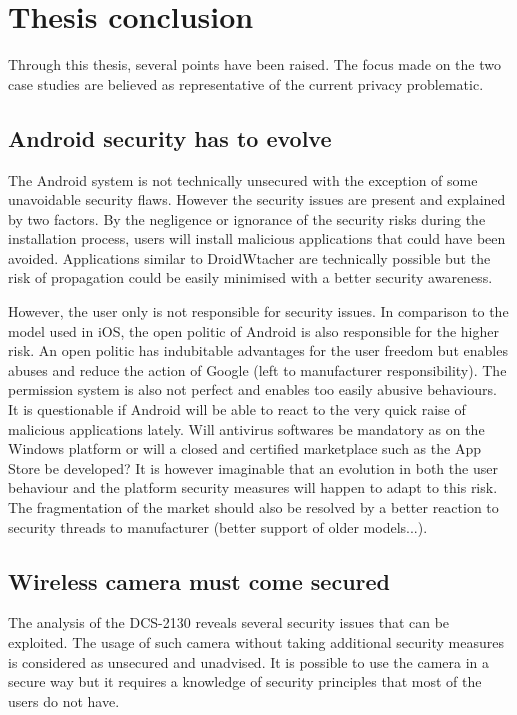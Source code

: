 \chapter{Thesis conclusion}

Through this thesis, several points have been raised.
The focus made on the two case studies are believed as representative of the current privacy problematic.

\section{Android security has to evolve}

The Android system is not technically unsecured with the exception of some unavoidable security flaws.
However the security issues are present and explained by two factors.
By the negligence or ignorance of the security risks during the installation process, users will install malicious applications that could have been avoided.
Applications similar to DroidWtacher are technically possible but the risk of propagation could be easily minimised with a better security awareness.

However, the user only is not responsible for security issues.
In comparison to the model used in iOS, the open politic of Android is also responsible for the higher risk.
An open politic has indubitable advantages for the user freedom but enables abuses and reduce the action of Google (left to manufacturer responsibility).
The permission system is also not perfect and enables too easily abusive behaviours.\\

It is questionable if Android will be able to react to the very quick raise of malicious applications lately.
Will antivirus softwares be mandatory as on the Windows platform or will a closed and certified marketplace such as the App Store be developed?
It is however imaginable that an evolution in both the user behaviour and the platform security measures will happen to adapt to this risk.
The fragmentation of the market should also be resolved by a better reaction to security threads to manufacturer (better support of older models...).

\section{Wireless camera must come secured}

The analysis of the DCS-2130 reveals several security issues that can be exploited.
The usage of such camera without taking additional security measures is  considered as unsecured and unadvised.
It is possible to use the camera in a secure way but it requires a knowledge of security principles that most of the users do not have.\\

